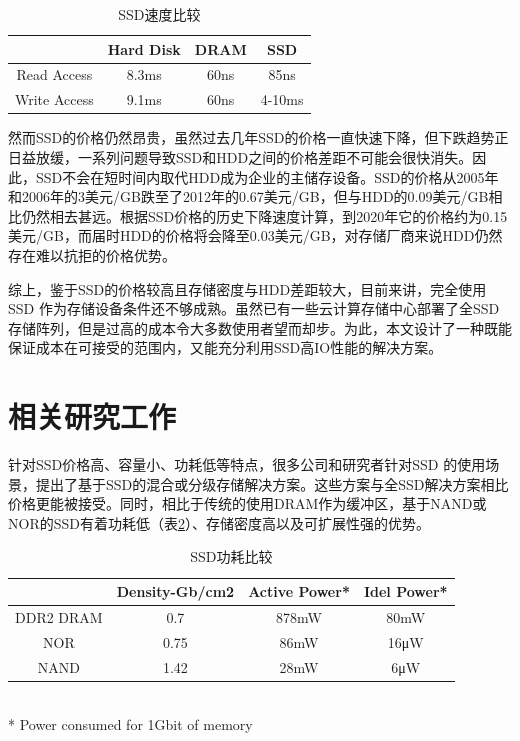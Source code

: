 \begin{table}[h]
\centering
\begin{tabular}{|c|c|c|c|}
\hline  & Hard Disk & DRAM & SSD \\ 
\hline Read Access & 8.3ms & 60ns & 85ns \\ 
\hline Write Access & 9.1ms & 60ns & 4-10ms \\ 
\hline 
\end{tabular} 
\caption{SSD速度比较}
\label{tab:ssd_speed_compare}
\end{table}

然而SSD的价格仍然昂贵，虽然过去几年SSD的价格一直快速下降，但下跌趋势正日益放缓，一系列问题导致SSD和HDD之间的价格差距不可能会很快消失。因此，SSD不会在短时间内取代HDD成为企业的主储存设备。SSD的价格从2005年和2006年的3美元/GB跌至了2012年的0.67美元/GB，但与HDD的0.09美元/GB相比仍然相去甚远。根据SSD价格的历史下降速度计算，到2020年它的价格约为0.15美元/GB，而届时HDD的价格将会降至0.03美元/GB，对存储厂商来说HDD仍然存在难以抗拒的价格优势。

综上，鉴于SSD的价格较高且存储密度与HDD差距较大，目前来讲，完全使用SSD 作为存储设备条件还不够成熟。虽然已有一些云计算存储中心部署了全SSD 存储阵列，但是过高的成本令大多数使用者望而却步。为此，本文设计了一种既能保证成本在可接受的范围内，又能充分利用SSD高IO性能的解决方案。

\section{相关研究工作}
\label{sec:related_works}

针对SSD价格高、容量小、功耗低等特点，很多公司和研究者针对SSD 的使用场景，提出了基于SSD的混合或分级存储解决方案。这些方案与全SSD解决方案相比价格更能被接受。同时，相比于传统的使用DRAM作为缓冲区，基于NAND或NOR的SSD有着功耗低（表\ref{tab:ssd_power_compare}）、存储密度高以及可扩展性强的优势。

\begin{table}[h]
\centering
\begin{tabular}{|c|c|c|c|}
\hline  & Density-Gb/cm2 & Active Power* & Idel Power* \\ 
\hline DDR2 DRAM & 0.7 & 878mW & 80mW \\ 
\hline NOR & 0.75 & 86mW & 16μW \\ 
\hline NAND & 1.42 & 28mW & 6μW \\ 
\hline 
\end{tabular}
\\ * Power consumed for 1Gbit of memory
\caption{SSD功耗比较}
\label{tab:ssd_power_compare}
\end{table}

